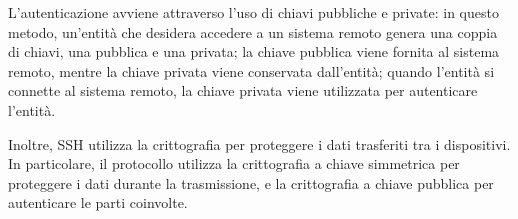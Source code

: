 L'autenticazione avviene attraverso l'uso di chiavi pubbliche e private: in questo metodo, un'entità che desidera accedere a un sistema remoto genera una coppia di chiavi, una pubblica e una privata; la chiave pubblica viene fornita al sistema remoto, mentre la chiave privata viene conservata dall'entità; quando l'entità si connette al sistema remoto, la chiave privata viene utilizzata per autenticare l'entità.

Inoltre, SSH utilizza la crittografia per proteggere i dati trasferiti tra i dispositivi. In particolare, il protocollo utilizza la crittografia a chiave simmetrica per proteggere i dati durante la trasmissione, e la crittografia a chiave pubblica per autenticare le parti coinvolte.